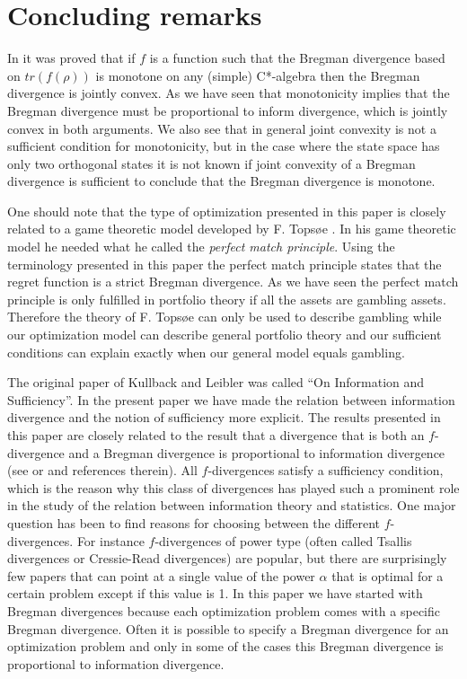 \documentclass[10pt,a4paper,draft]{article}
\begin{document}
\section{Concluding remarks}

In \cite{Pitrik2015} it was proved that if $f$ is a function such that the Bregman divergence based on $tr(f(\rho))$
is monotone on any (simple) C*-algebra then the Bregman divergence is jointly convex. As we have seen that monotonicity implies that the Bregman divergence must be proportional to inform divergence, which is jointly convex in both arguments. We also see that in general joint convexity is not a sufficient condition for monotonicity, but in the case where the state space has only two orthogonal states it is not known if joint convexity of a Bregman divergence is sufficient to conclude that the Bregman divergence is monotone.

One should note that the type of optimization presented in this paper is closely related to a game theoretic model developed by F. Tops\o e \cite{Topsoe2008,Topsoe2011}. In his game theoretic model he needed what he called the {\em perfect match principle}. Using the terminology presented in this paper the perfect match principle states that the regret function is a strict Bregman divergence. As we have seen the perfect match principle is only fulfilled in portfolio theory if all the assets are gambling assets. Therefore the theory of F. Tops\o e can only be used to describe gambling while our optimization model can describe general portfolio theory and our sufficient conditions can explain exactly when our general model equals gambling.

The original paper of Kullback and Leibler \cite{Kullback1951}
was called ``On Information and Sufficiency''. In the present paper
we have made the relation between information divergence and the
notion of sufficiency more explicit. The results presented in this
paper are closely related to the result that a divergence that
is both an $f$-divergence and
a Bregman divergence is proportional to information divergence
(see \cite{Harremoes2007a} or \cite{Amari2009} and references
therein). All $f$-divergences satisfy a sufficiency condition, which is the
reason why this class of divergences has played such a
prominent role in the study of
the relation between information theory and statistics. One
major question has been to find reasons for choosing between the
different $f$-divergences.
For instance $f$-divergences of power type (often called Tsallis
divergences or Cressie-Read divergences) are popular, but there
are surprisingly few papers that can point at a single value of the power $\alpha$
that is optimal for a certain problem except if this
value is 1. In this paper we have started with Bregman divergences because each optimization
problem comes with a specific Bregman divergence. Often it is
possible to specify a Bregman divergence for an optimization problem and only in some
of the cases this Bregman divergence is proportional to
information divergence.
\end{document}
